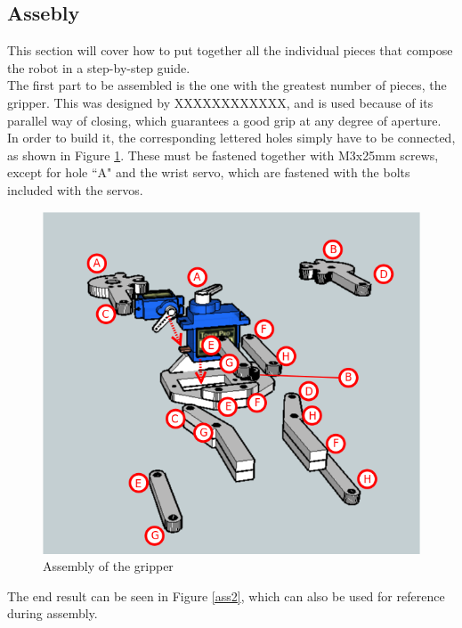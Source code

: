 \subsection{Assebly}

This section will cover how to put together all the individual pieces that compose the robot in a step-by-step guide.\\


The first part to be assembled is the one with the greatest number of pieces, the gripper. This was designed by XXXXXXXXXXXX, and is used because of its parallel way of closing, which guarantees a good grip at any degree of aperture. In order to build it, the corresponding lettered holes simply have to be connected, as shown in Figure \ref{ass1}. These must be fastened together with M3x25mm screws, except for hole ``A" and the wrist servo, which are fastened with the bolts included with the servos.\\

	\begin{figure}[H]
			\centering
			\includegraphics[scale=0.7]{images/Assembly/1-2.png}
			\caption{Assembly of the gripper }
			\label{ass1}
	\end{figure}
	\bigskip

The end result can be seen in Figure \ref{ass2}, which can also be used for reference during assembly.\\


